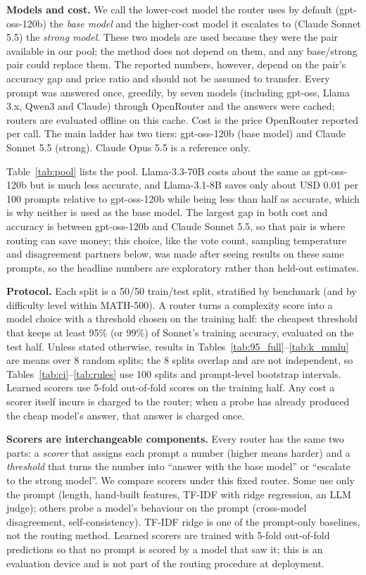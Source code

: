 \documentclass[11pt]{article}
\begin{document}
\textbf{Models and cost.} We call the lower-cost model the router uses by default (gpt-oss-120b) the \emph{base model} and the higher-cost model it escalates to (Claude Sonnet 5.5) the \emph{strong model}. These two models are used because they were the pair available in our pool; the method does not depend on them, and any base/strong pair could replace them. The reported numbers, however, depend on the pair's accuracy gap and price ratio and should not be assumed to transfer. Every prompt was answered once, greedily, by seven models (including gpt-oss, Llama 3.x, Qwen3 and Claude) through OpenRouter \cite{openrouter,openai2025gptoss,dubey2024llama3,yang2025qwen3,anthropic_claude} and the answers were cached; routers are evaluated offline on this cache. Cost is the price OpenRouter reported per call. The main ladder has two tiers: gpt-oss-120b (base model) and Claude Sonnet 5.5 (strong). Claude Opus 5.5 is a reference only.

Table~\ref{tab:pool} lists the pool. Llama-3.3-70B costs about the same as gpt-oss-120b but is much less accurate, and Llama-3.1-8B saves only about USD 0.01 per 100 prompts relative to gpt-oss-120b while being less than half as accurate, which is why neither is used as the base model. The largest gap in both cost and accuracy is between gpt-oss-120b and Claude Sonnet 5.5, so that pair is where routing can save money; this choice, like the vote count, sampling temperature and disagreement partners below, was made after seeing results on these same prompts, so the headline numbers are exploratory rather than held-out estimates.



\textbf{Protocol.} Each split is a 50/50 train/test split, stratified by benchmark (and by difficulty level within MATH-500). A router turns a complexity score into a model choice with a threshold chosen on the training half: the cheapest threshold that keeps at least 95\% (or 99\%) of Sonnet's training accuracy, evaluated on the test half. Unless stated otherwise, results in Tables~\ref{tab:95_full}--\ref{tab:k_mmlu} are means over 8 random splits; the 8 splits overlap and are not independent, so Tables~\ref{tab:ci}--\ref{tab:rules} use 100 splits and prompt-level bootstrap intervals. Learned scorers use 5-fold out-of-fold scores on the training half. Any cost a scorer itself incurs is charged to the router; when a probe has already produced the cheap model's answer, that answer is charged once.

\textbf{Scorers are interchangeable components.} Every router has the same two parts: a \emph{scorer} that assigns each prompt a number (higher means harder) and a \emph{threshold} that turns the number into ``answer with the base model'' or ``escalate to the strong model''. We compare scorers under this fixed router. Some use only the prompt (length, hand-built features, TF-IDF with ridge regression, an LLM judge); others probe a model's behaviour on the prompt (cross-model disagreement, self-consistency). TF-IDF ridge is one of the prompt-only baselines, not the routing method. Learned scorers are trained with 5-fold out-of-fold predictions so that no prompt is scored by a model that saw it; this is an evaluation device and is not part of the routing procedure at deployment.
\end{document}
